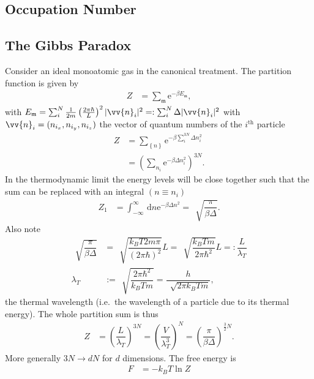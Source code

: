 \documentclass[a4paper,10pt]{article}
\newcommand{\td}{\,\text{d}}
\numberwithin{equation}{section}
\begin{document}
\begin{multicols}{2}

\section{Occupation Number}
\subsection{The Gibbs Paradox}
Consider an ideal monoatomic gas in the canonical treatment.
The partition function is given by
\begin{align} 
  Z &= \sum_{\mathfrak{m}}^{}\text{e}^{-\beta E_\mathfrak{m}}
,\end{align} 
with $E_\mathfrak{m}=\sum_{i}^{N}\tfrac{1}{2m}\left(\tfrac{2\pi \hbar }{L}\right)^2|\vv{n}_i|^2=:\sum_{i}^{N}\Delta |\vv{n}_i|^2$ with $\vv{n}_i=(n_{i_x}, n_{i_y}, n_{i_z})$ the vector of quantum numbers of the $i^\text{th}$ particle
\begin{align} 
  Z &= \sum_{ \left\{n\right\}}^{}\text{e}^{-\beta \sum_{i}^{3N}\Delta n_i^2}\\
    &= \left(\sum_{n_i}^{}\text{e}^{-\beta \Delta n_i^2}\right)^{3N}
.\end{align} 
In the thermodynamic limit the energy levels will be close together such that the sum can be replaced with an integral $(n\equiv n_i)$ 
\begin{align} 
  Z_1 &= \int_{-\infty}^{\infty}\td n \text{e}^{-\beta \Delta n^2} = \,\sqrt[]{\dfrac{\pi }{\beta \Delta }}
.\end{align} 
Also note
\begin{align} 
  \,\sqrt[]{\dfrac{\pi }{\beta \Delta }} &= \,\sqrt[]{\dfrac{k_BT2m\pi }{(2\pi \hbar )^2}}L = \,\sqrt[]{\dfrac{k_BTm}{2\pi \hbar ^2}}L =: \dfrac{L}{\lambda _T}\\
  \lambda _T &:= \,\sqrt[]{\dfrac{2\pi \hbar ^2}{k_BTm}} = \dfrac{h}{\,\sqrt[]{2\pi k_BTm}}
,\end{align} 
the thermal wavelength (i.e.\ the wavelength of a particle due to its thermal energy).
The whole partition sum is thus
\begin{align} 
  Z &= \left(\dfrac{L}{\lambda _T}\right)^{3N}=\left(\dfrac{V}{\lambda _T^3}\right)^N=\left(\dfrac{\pi }{\beta \Delta }\right)^{\tfrac{3}{2}N}
.\end{align} 
More generally $3N\rightarrow dN$ for $d$ dimensions.
The free energy is
\begin{align} 
  F &= -k_BT\ln Z\\

\end{align}
\end{multicols}
\end{document}
